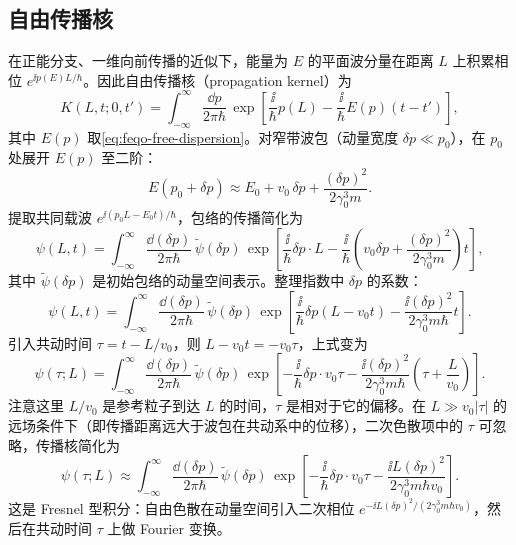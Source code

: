 \subsection{自由传播核}

在正能分支、一维向前传播的近似下，能量为 $E$ 的平面波分量在距离 $L$ 上积累相位 $e^{\ii p(E)L/\hbar}$。因此自由传播核（propagation kernel）为
\begin{equation}
K(L,t;0,t')=\int_{-\infty}^{\infty}\frac{\dd p}{2\pi\hbar}\,
\exp\!\left[\frac{\ii}{\hbar}p(L)-\frac{\ii}{\hbar}E(p)(t-t')\right],
\label{eq:feqo-prop-kernel}
\end{equation}
其中 $E(p)$ 取\cref{eq:feqo-free-dispersion}。对窄带波包（动量宽度 $\delta p\ll p_0$），在 $p_0$ 处展开 $E(p)$ 至二阶：
\begin{equation}
E(p_0+\delta p)\approx E_0+v_0\,\delta p+\frac{(\delta p)^2}{2\gamma_0^3 m}.
\label{eq:feqo-energy-taylor-p}
\end{equation}
提取共同载波 $e^{\ii(p_0 L - E_0 t)/\hbar}$，包络的传播简化为
\begin{equation}
\psi(L,t)=\int_{-\infty}^{\infty}\frac{\dd(\delta p)}{2\pi\hbar}\,
\widetilde\psi(\delta p)\,
\exp\!\left[\frac{\ii}{\hbar}\delta p\cdot L
-\frac{\ii}{\hbar}\left(v_0\delta p+\frac{(\delta p)^2}{2\gamma_0^3 m}\right)t\right],
\label{eq:feqo-envelope-propagation}
\end{equation}
其中 $\widetilde\psi(\delta p)$ 是初始包络的动量空间表示。整理指数中 $\delta p$ 的系数：
\begin{equation}
\psi(L,t)=\int_{-\infty}^{\infty}\frac{\dd(\delta p)}{2\pi\hbar}\,
\widetilde\psi(\delta p)\,
\exp\!\left[\frac{\ii}{\hbar}\delta p\left(L-v_0 t\right)
-\frac{\ii(\delta p)^2}{2\gamma_0^3 m\hbar}t\right].
\label{eq:feqo-envelope-prop-expanded}
\end{equation}
引入共动时间 $\tau = t - L/v_0$，则 $L - v_0 t = -v_0\tau$，上式变为
\begin{equation}
\psi(\tau;L)=\int_{-\infty}^{\infty}\frac{\dd(\delta p)}{2\pi\hbar}\,
\widetilde\psi(\delta p)\,
\exp\!\left[-\frac{\ii}{\hbar}\delta p\cdot v_0\tau
-\frac{\ii(\delta p)^2}{2\gamma_0^3 m\hbar}\left(\tau+\frac{L}{v_0}\right)\right].
\label{eq:feqo-envelope-comoving}
\end{equation}
注意这里 $L/v_0$ 是参考粒子到达 $L$ 的时间，$\tau$ 是相对于它的偏移。在 $L\gg v_0|\tau|$ 的远场条件下（即传播距离远大于波包在共动系中的位移），二次色散项中的 $\tau$ 可忽略，传播核简化为
\begin{equation}
\psi(\tau;L)\approx\int_{-\infty}^{\infty}\frac{\dd(\delta p)}{2\pi\hbar}\,
\widetilde\psi(\delta p)\,
\exp\!\left[-\frac{\ii}{\hbar}\delta p\cdot v_0\tau
-\frac{\ii L(\delta p)^2}{2\gamma_0^3 m\hbar v_0}\right].
\label{eq:feqo-far-field-kernel}
\end{equation}
这是 Fresnel 型积分：自由色散在动量空间引入二次相位 $e^{-\ii L(\delta p)^2/(2\gamma_0^3 m\hbar v_0)}$，然后在共动时间 $\tau$ 上做 Fourier 变换。

